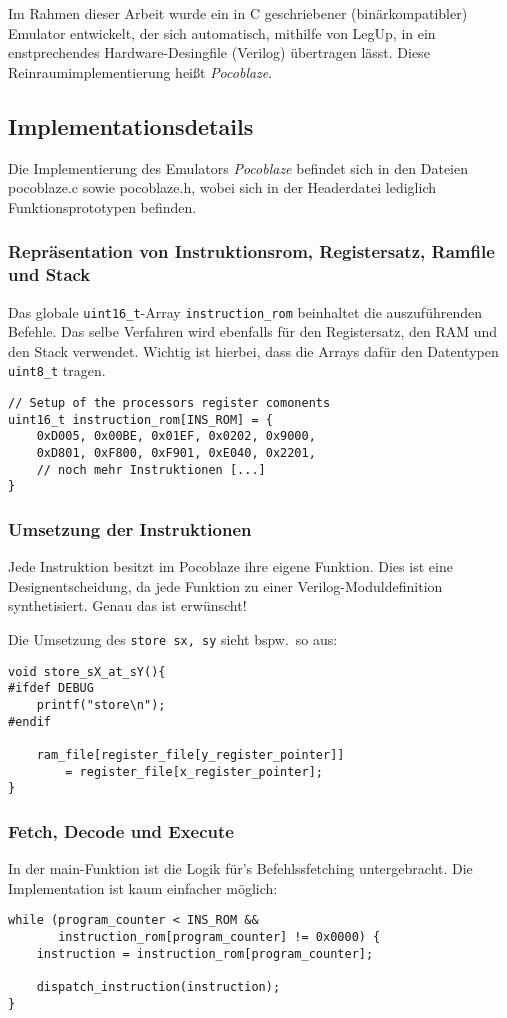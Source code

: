 \documentclass[oneside,a4paper]{article}
\def\A#1{\lstinline[style=asm]{#1}}
\def\C#1{\lstinline[style=c]{#1}}
\begin{document}
Im Rahmen dieser Arbeit wurde ein in C geschriebener (binärkompatibler)
Emulator entwickelt, der sich automatisch, mithilfe von LegUp, in
ein enstprechendes Hardware-Desingfile (Verilog) übertragen lässt.
Diese Reinraumimplementierung heißt \emph{Pocoblaze}.

\subsection{Implementationsdetails}
Die Implementierung des Emulators \emph{Pocoblaze} befindet sich in den
Dateien pocoblaze.c sowie pocoblaze.h, wobei sich in der Headerdatei
lediglich Funktionsprototypen befinden.

\subsubsection{Repräsentation von Instruktionsrom, Registersatz, Ramfile und Stack}
Das globale \C{uint16_t}-Array \C{instruction_rom} beinhaltet
die auszuführenden Befehle. Das selbe Verfahren wird ebenfalls
für den Registersatz, den RAM und den Stack verwendet. Wichtig
ist hierbei, dass die Arrays dafür den Datentypen \C{uint8_t}
tragen.

\begin{lstlisting}[style=c]
// Setup of the processors register comonents
uint16_t instruction_rom[INS_ROM] = {
    0xD005, 0x00BE, 0x01EF, 0x0202, 0x9000,
    0xD801, 0xF800, 0xF901, 0xE040, 0x2201,
    // noch mehr Instruktionen [...]
}
\end{lstlisting}

\subsubsection{Umsetzung der Instruktionen}
Jede Instruktion besitzt im Pocoblaze ihre eigene Funktion.
Dies ist eine Designentscheidung, da jede Funktion zu einer
Verilog-Moduldefinition synthetisiert. Genau das ist erwünscht!

Die Umsetzung des \A{store sx, sy} sieht bspw.\ so aus:
\begin{lstlisting}[style=c]
void store_sX_at_sY(){
#ifdef DEBUG
    printf("store\n");
#endif

    ram_file[register_file[y_register_pointer]]
        = register_file[x_register_pointer];
}
\end{lstlisting}

\subsubsection{Fetch, Decode und Execute}
In der main-Funktion ist die Logik für's Befehlssfetching untergebracht.
Die Implementation ist kaum einfacher möglich:
\begin{lstlisting}[style=c]
while (program_counter < INS_ROM &&
       instruction_rom[program_counter] != 0x0000) {
    instruction = instruction_rom[program_counter];

    dispatch_instruction(instruction);
}
\end{lstlisting}
\end{document}
